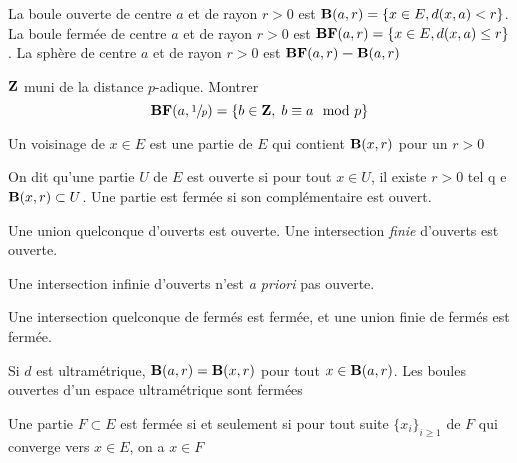 \begin{dfn}
    La boule ouverte de centre $a$ et de rayon  $r>0$ est  $\mathbf B(a, r)=\{x \in  E, d(x, a)<r\}$. La boule fermée de centre $a$ et de rayon  $r>0$ est  $\mathbf {BF}(a, r)=\{x \in  E, d(x, a)\leq r\}$. La sphère de centre $a$ et de rayon  $r>0$ est $\mathbf {BF}(a, r)\bm- \mathbf B(a, r)$
\end{dfn}


\begin{exo}
$\mathbf Z$ muni de la distance $p$-adique. Montrer \[
    \mathbf {BF}(a, \sfrac{1}{p})= \left\{ b \in  \mathbf Z, \; b\equiv a \mod p \right\} 
\] 
\end{exo}

\begin{dfn}
    Un voisinage de $x \in  E$ est une partie de $E$ qui contient  $\mathbf B(x, r)$ pour un $r>0$
\end{dfn}

\begin{dfn}
    On dit qu'une partie $U$ de $E$ est ouverte si pour tout $x \in  U$, il existe $r>0$ tel q e $ \mathbf B(x, r) \subset U$. Une partie est fermée si son complémentaire est ouvert.
\end{dfn}

\begin{prop}
    Une union quelconque d'ouverts est ouverte. Une intersection \emph{finie} d'ouverts est ouverte.
\end{prop}

\begin{rem}
Une intersection infinie d'ouverts n'est \emph{a priori} pas ouverte.
\end{rem}

\begin{cor}
Une intersection quelconque de fermés est fermée, et une union finie de fermés est fermée.
\end{cor}

\begin{exo}
    Si $d$ est ultramétrique,  $\mathbf B(a, r)=\mathbf B(x, r)$ pour tout $x \in  \mathbf B(a, r)$. Les boules ouvertes d'un espace ultramétrique sont fermées
\end{exo}

\begin{thm}
    Une partie $F\subset E$ est fermée  si et seulement si pour tout suite $\{x_i\}_{i\geq 1}$ de $F$ qui converge vers $x \in  E$, on a $x \in  F$
\end{thm}

